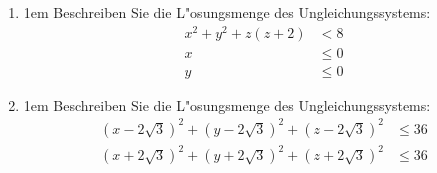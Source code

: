 \begin{enumerate}
\item{\abovedisplayskip1em Beschreiben Sie die L"osungsmenge des Ungleichungssystems: \begin{align*}x^2 + y^2 + z(z+2) &< 8\\ x &\leq 0\\ y &\leq 0\end{align*}}
\item{\abovedisplayskip1em Beschreiben Sie die L"osungsmenge des Ungleichungssystems: \begin{align*}(x-2\sqrt{3})^2 + (y-2\sqrt{3})^2 + (z-2\sqrt{3})^2 &\leq 36\\ (x+2\sqrt{3})^2 + (y+2\sqrt{3})^2 + (z+2\sqrt{3})^2 &\leq 36\end{align*}}
\end{enumerate}

